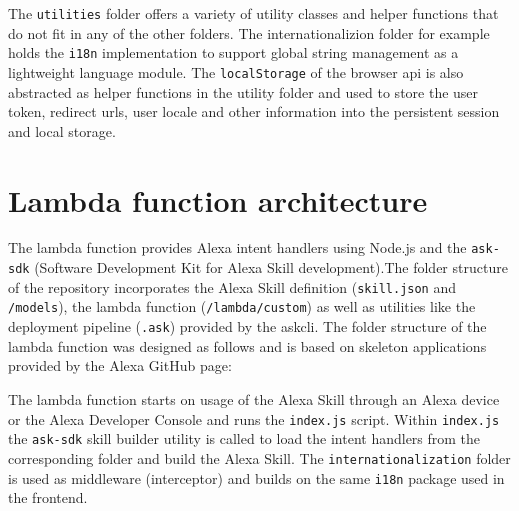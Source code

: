 The \texttt{utilities} folder offers a variety of utility classes and helper functions that do not fit in any of the other folders. The internationalizion folder for example holds the \texttt{i18n} implementation to support global string management as a lightweight language module. The \texttt{localStorage} of the browser api is also abstracted as helper functions in the utility folder and used to store the user token, redirect urls, user locale and other information into the persistent session and local storage. 

\section{Lambda function architecture} \label{lambda}

The lambda function provides Alexa intent handlers using Node.js and the \texttt{ask-sdk} (Software Development Kit for Alexa Skill development).The folder structure of the repository incorporates the Alexa Skill definition (\texttt{skill.json} and \texttt{/models}), the lambda function (\texttt{/lambda/custom}) as well as utilities like the deployment pipeline (\texttt{.ask}) provided by the \gls{askcli}. The folder structure of the lambda function was designed as follows and is based on skeleton applications provided by the Alexa GitHub page: \vspace{1em}


The lambda function starts on usage of the Alexa Skill through an Alexa device or the Alexa Developer Console and runs the \texttt{index.js} script. Within \texttt{index.js} the \texttt{ask-sdk} skill builder utility is called to load the intent handlers from the corresponding folder and build the Alexa Skill. The \texttt{internationalization} folder is used as middleware (interceptor) and builds on the same \texttt{i18n} package used in the frontend. 


